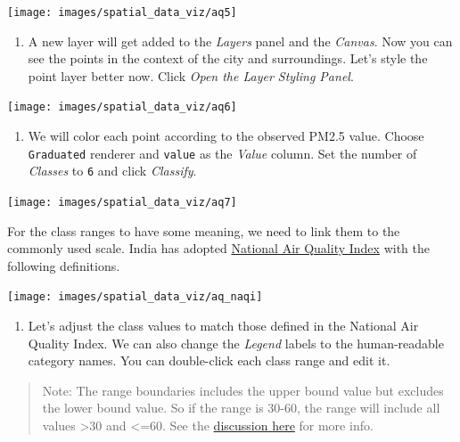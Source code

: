\documentclass[
  12pt,
  a4paper]{article}
\providecommand{\tightlist}{%
  \setlength{\itemsep}{0pt}\setlength{\parskip}{0pt}}
\begin{document}
\begin{center}\texttt{[image: images/spatial\_data\_viz/aq5]} \end{center}

\begin{enumerate}
\def\labelenumi{\arabic{enumi}.}
\setcounter{enumi}{5}
\tightlist
\item
  A new layer will get added to the \emph{Layers} panel and the
  \emph{Canvas}. Now you can see the points in the context of the city
  and surroundings. Let's style the point layer better now. Click
  \emph{Open the Layer Styling Panel}.
\end{enumerate}

\begin{center}\texttt{[image: images/spatial\_data\_viz/aq6]} \end{center}

\begin{enumerate}
\def\labelenumi{\arabic{enumi}.}
\setcounter{enumi}{6}
\tightlist
\item
  We will color each point according to the observed PM2.5 value. Choose
  \texttt{Graduated} renderer and \texttt{value} as the \emph{Value}
  column. Set the number of \emph{Classes} to \texttt{6} and click
  \emph{Classify}.
\end{enumerate}

\begin{center}\texttt{[image: images/spatial\_data\_viz/aq7]} \end{center}

For the class ranges to have some meaning, we need to link them to the
commonly used scale. India has adopted
\href{https://pib.gov.in/newsite/PrintRelease.aspx?relid=110654}{National
Air Quality Index} with the following definitions.

\begin{center}\texttt{[image: images/spatial\_data\_viz/aq\_naqi]} \end{center}

\begin{enumerate}
\def\labelenumi{\arabic{enumi}.}
\setcounter{enumi}{7}
\tightlist
\item
  Let's adjust the class values to match those defined in the National
  Air Quality Index. We can also change the \emph{Legend} labels to the
  human-readable category names. You can double-click each class range
  and edit it.
\end{enumerate}

\begin{quote}
Note: The range boundaries includes the upper bound value but excludes
the lower bound value. So if the range is 30-60, the range will include
all values \textgreater30 and \textless=60. See the
\href{https://github.com/qgis/QGIS/issues/29852}{discussion here} for
more info.
\end{quote}
\end{document}
